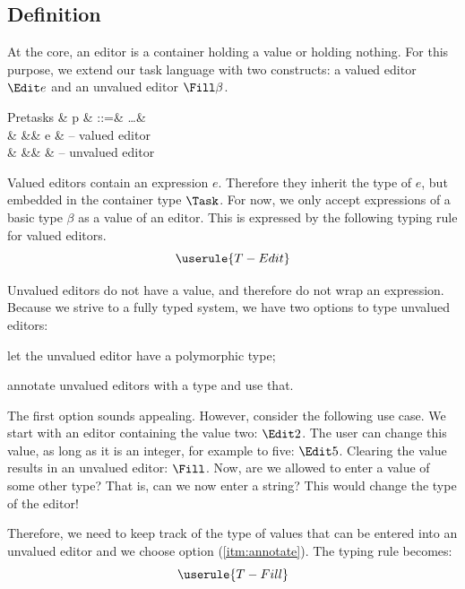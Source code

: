 \subsection{Definition}

At the core,
an editor is a container holding a value
or holding nothing.
For this purpose, we extend our task language with two constructs:
a valued editor $\Edit e$ and an unvalued editor $\Fill \beta$.
\begin{grammar}
  Pretasks
    & p & ::=& \ldots      & \\
    &   &\mid& \Edit e     & – valued editor \\
    &   &\mid& \Fill \beta & – unvalued editor \\
\end{grammar}

Valued editors contain an expression $e$.
Therefore they inherit the type of $e$,
but embedded in the container type $\Task$.
For now, we only accept expressions of a basic type $\beta$ as a value of an editor.
This is expressed by the following typing rule for valued editors.
\begin{equation*}
  \userule{T-Edit}
\end{equation*}

Unvalued editors do not have a value,
and therefore do not wrap an expression.
Because we strive to a fully typed system,
we have two options to type unvalued editors:
\begin{enumerate*}
  \item let the unvalued editor have a polymorphic type;
  \item annotate unvalued editors with a type and use that. \label{itm:annotate}
\end{enumerate*}

The first option sounds appealing.
However, consider the following use case.
We start with an editor containing the value two: $\Edit 2$.
The user can change this value, as long as it is an integer,
for example to five: $\Edit 5$.
Clearing the value results in an unvalued editor: $\Fill$.
Now, are we allowed to enter a value of some other type?
That is, can we now enter a string?
This would change the type of the editor!

Therefore,
we need to keep track of the type of values that can be entered into an unvalued editor
and we choose option (\ref{itm:annotate}).
The typing rule becomes:
\begin{equation*}
  \userule{T-Fill}
\end{equation*}

